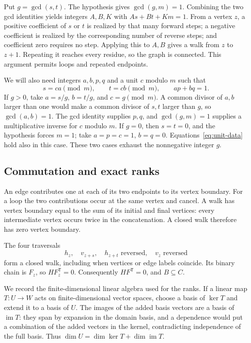 \documentclass{article}
\numberwithin{equation}{section}
\begin{document}
Put \(g=\gcd(s,t)\). The hypothesis gives \(\gcd(g,m)=1\). Combining the two
gcd identities yields integers \(A,B,K\) with \(As+Bt+Km=1\). From a vertex
\(z\), a positive coefficient of \(s\) or \(t\) is realized by that many forward
steps; a negative coefficient is realized by the corresponding number of
reverse steps; and coefficient zero requires no step. Applying this to \(A,B\)
gives a walk from \(z\) to \(z+1\). Repeating it reaches every residue, so the
graph is connected. This argument permits loops and repeated endpoints.

We will also need integers \(a,b,p,q\) and a unit \(c\) modulo \(m\) such that
\begin{equation}\label{eq:unit-data}
  s=ca\pmod m,\qquad t=cb\pmod m,\qquad ap+bq=1.
\end{equation}
If \(g>0\), take \(a=s/g\), \(b=t/g\), and \(c=g\pmod m\). A common divisor
of \(a,b\) larger than one would make a common divisor of \(s,t\) larger than
\(g\), so \(\gcd(a,b)=1\). The gcd identity supplies \(p,q\), and
\(\gcd(g,m)=1\) supplies a multiplicative inverse for \(c\) modulo \(m\).
If \(g=0\), then \(s=t=0\), and the hypothesis forces \(m=1\); take
\(a=p=c=1\), \(b=q=0\). Equations~\eqref{eq:unit-data} hold also in this case. These two
cases exhaust the nonnegative integer \(g\).

\subsection{Commutation and exact ranks}\label{sec:I-ranks}

An edge contributes one at each of its two endpoints to its vertex boundary.
For a loop the two contributions occur at the same vertex and cancel. A walk
has vertex boundary equal to the sum of its initial and final vertices:
every intermediate vertex occurs twice in the concatenation. A closed walk
therefore has zero vertex boundary.

The four traversals
\begin{equation}\label{eq:square-walk}
  h_z,\quad v_{z+s},\quad h_{z+t}\text{ reversed},\quad v_z\text{ reversed}
\end{equation}
form a closed walk, including when vertices or edge labels coincide. Its
binary chain is \(F_z\), so \(HF_z^{\mathsf T}=0\). Consequently
\(HF^{\mathsf T}=0\), and \(B\subseteq C\).

We record the finite-dimensional linear algebra used for the ranks. If a
linear map \(T:U\to W\) acts on finite-dimensional vector spaces, choose a
basis of \(\ker T\) and extend it to a basis of \(U\). The images of the added
basis vectors are a basis of \(\operatorname{im}T\): they span by expansion in
the domain basis, and a dependence would put a combination of the added
vectors in the kernel, contradicting independence of the full basis. Thus
\(\dim U=\dim\ker T+\dim\operatorname{im}T\).
\end{document}
